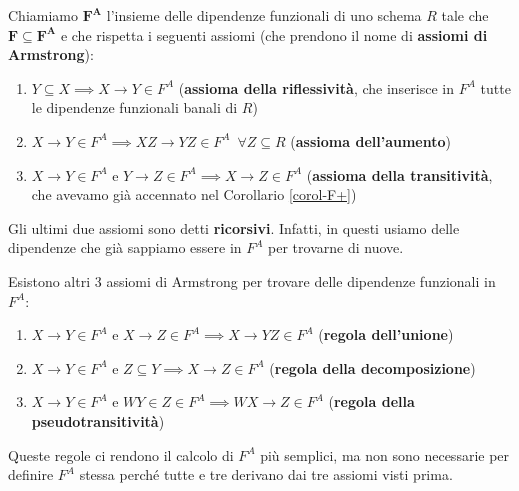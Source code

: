 \documentclass[11pt, a4paper, titlepage, oneside]{scrbook}
\begin{document}
\begin{Definizione}[$\bm{F^A}$]
\label{def-F-A}
Chiamiamo $\bm{F^A}$ l'insieme delle dipendenze funzionali di uno schema $R$ tale che $\bm{F \subseteq F^A}$ e che rispetta i seguenti assiomi (che prendono il nome di \textbf{assiomi di Armstrong}):
\begin{enumerate}
    \item $Y \subseteq X \implies X \longrightarrow Y \in F^A$ (\textbf{assioma della riflessività}, che inserisce in $F^A$ tutte le dipendenze funzionali banali di $R$)
    \item $X \longrightarrow Y \in F^A \implies XZ \longrightarrow YZ \in F^A \enspace \forall Z \subseteq R$ (\textbf{assioma dell'aumento})
    \item $X \longrightarrow Y  \in F^A$ e $Y \longrightarrow Z \in F^A \implies X \longrightarrow Z \in F^A$ (\textbf{assioma della transitività}, che avevamo già accennato nel Corollario \ref{corol-F+}) 
\end{enumerate} 
Gli ultimi due assiomi sono detti \textbf{ricorsivi}. Infatti, in questi usiamo delle dipendenze che già sappiamo essere in $F^A$ per trovarne di nuove. 
\end{Definizione}

\begin{Proprieta}
\label{prop-altri-assiomi-Armstrong}
Esistono altri 3 assiomi di Armstrong per trovare delle dipendenze funzionali in $F^A$:
\begin{enumerate}[start = 4]
    \item $X \longrightarrow Y \in F^A$ e $X \longrightarrow Z \in F^A \implies X \longrightarrow YZ \in F^A$ (\textbf{regola dell'unione})
    \item $X \longrightarrow Y \in F^A$ e $Z \subseteq  Y \implies X \longrightarrow Z \in F^A$ (\textbf{regola della decomposizione})
    \item $X \longrightarrow Y \in F^A$ e $WY \in Z \in F^A \implies WX \longrightarrow Z \in F^A$ (\textbf{regola della pseudotransitività})
\end{enumerate}
Queste regole ci rendono il calcolo di $F^A$ più semplici, ma non sono necessarie per definire $F^A$ stessa perché tutte e tre derivano dai tre assiomi visti prima.
\end{Proprieta}

\Dimostrazione \nopagebreak
\end{document}
